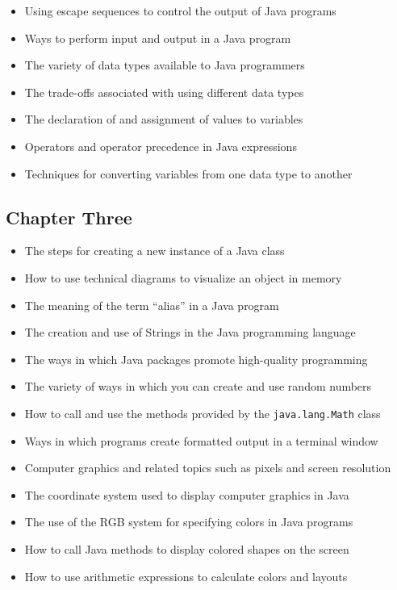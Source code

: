 \documentclass[11pt]{article}
\begin{document}
\begin{itemize}

  \itemsep 0in

  \item Using escape sequences to control the output of Java programs
  \item Ways to perform input and output in a Java program
  \item The variety of data types available to Java programmers
  \item The trade-offs associated with using different data types
  \item The declaration of and assignment of values to variables
  \item Operators and operator precedence in Java expressions
  \item Techniques for converting variables from one data type to another

\end{itemize}

\vspace*{-.2in}
\subsection*{Chapter Three}

\begin{itemize}

  \itemsep 0in

  \item The steps for creating a new instance of a Java class
  \item How to use technical diagrams to visualize an object in memory
  \item The meaning of the term ``alias'' in a Java program
  \item The creation and use of Strings in the Java programming language
  \item The ways in which Java packages promote high-quality programming
  \item The variety of ways in which you can create and use random numbers
  \item How to call and use the methods provided by the {\tt java.lang.Math} class
  \item Ways in which programs create formatted output in a terminal window
  \item Computer graphics and related topics such as pixels and screen resolution
  \item The coordinate system used to display computer graphics in Java
  \item The use of the RGB system for specifying colors in Java programs
  \item How to call Java methods to display colored shapes on the screen
  \item How to use arithmetic expressions to calculate colors and layouts

\end{itemize}
\end{document}
